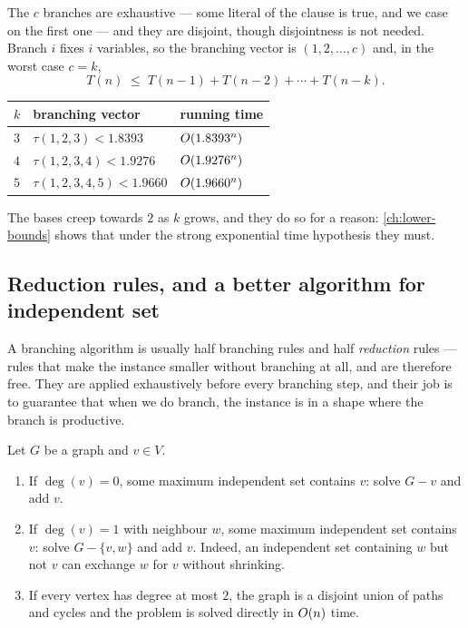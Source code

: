 The $c$ branches are exhaustive --- some literal of the clause is true, and we
case on the first one --- and they are disjoint, though disjointness is not
needed. Branch $i$ fixes $i$ variables, so the branching vector is
$(1, 2, \ldots, c)$ and, in the worst case $c = k$,
\[ T(n) \;\le\; T(n-1) + T(n-2) + \cdots + T(n-k). \]

\begin{center}
\begin{tabular}{@{}lll@{}}
\toprule
$k$ & branching vector & running time \\
\midrule
$3$ & $\tau(1,2,3) < 1.8393$ & $O\!\left(1.8393^n\right)$ \\
$4$ & $\tau(1,2,3,4) < 1.9276$ & $O\!\left(1.9276^n\right)$ \\
$5$ & $\tau(1,2,3,4,5) < 1.9660$ & $O\!\left(1.9660^n\right)$ \\
\bottomrule
\end{tabular}
\end{center}

The bases creep towards $2$ as $k$ grows, and they do so for a reason:
\cref{ch:lower-bounds} shows that under the strong exponential time hypothesis
they must.

\subsection{Reduction rules, and a better algorithm for independent set}

A branching algorithm is usually half branching rules and half \emph{reduction}
rules --- rules that make the instance smaller without branching at all, and
are therefore free. They are applied exhaustively before every branching step,
and their job is to guarantee that when we do branch, the instance is in a shape
where the branch is productive.

\begin{observation}\label{obs:mis-reductions}
Let $G$ be a graph and $v \in V$.
\begin{enumerate}[label=(\roman*),leftmargin=*]
  \item If $\deg(v) = 0$, some maximum independent set contains $v$: solve
        $G - v$ and add $v$.
  \item If $\deg(v) = 1$ with neighbour $w$, some maximum independent set contains
        $v$: solve $G - \{v,w\}$ and add $v$. Indeed, an independent set
        containing $w$ but not $v$ can exchange $w$ for $v$ without shrinking.
  \item If every vertex has degree at most $2$, the graph is a disjoint union
        of paths and cycles and the problem is solved directly in $O\!\left(n\right)$
        time.
\end{enumerate}
\end{observation}

